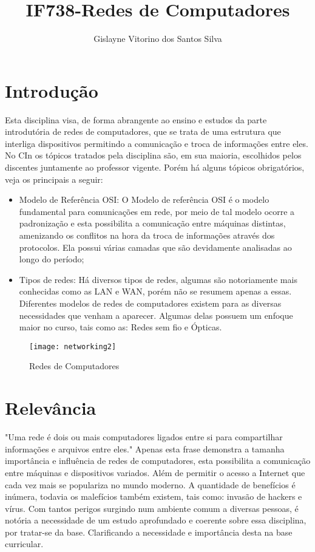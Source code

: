 \documentclass{article}
\title{IF738-Redes de Computadores}
\author{Gislayne Vitorino dos Santos Silva }
\date{\vspace{-5ex}}
\begin{document}
\maketitle

\section{Introdução}
Esta disciplina visa, de forma abrangente ao ensino e estudos da parte introdutória de redes de computadores, que se trata de uma estrutura que interliga dispositivos permitindo a comunicação e troca de informações entre eles. No CIn os tópicos tratados pela disciplina são, em sua maioria, escolhidos pelos discentes juntamente ao professor vigente.
\cite{primeira, segunda}
Porém há alguns tópicos obrigatórios, veja os principais a seguir:
\begin{itemize}
   \item Modelo de Referência OSI: O Modelo de referência OSI é o modelo fundamental para comunicações em rede, por meio de tal modelo ocorre a padronização e esta possibilita a comunicação entre máquinas distintas, amenizando os conflitos na hora da troca de informações através dos protocolos. Ela possui várias camadas que são devidamente analisadas ao longo do período;
   \cite{terceira, sexta}
   \item Tipos de redes: Há diversos tipos de redes, algumas são notoriamente mais conhecidas como as LAN e WAN, porém não se resumem apenas a essas. Diferentes modelos de redes de computadores existem para as diversas necessidades que venham a aparecer. Algumas delas possuem um enfoque maior no curso, tais como as: Redes sem fio e Ópticas.
   \cite{setima}
 \end{itemize}


\begin{figure}[h!]
\centering
\texttt{[image: networking2]}
\caption{Redes de Computadores}
\cite{nona}
\label{fig: networking2}
\end{figure}

\section{Relevância}
"Uma rede é dois ou mais computadores ligados entre si para compartilhar informações e arquivos entre eles."
\cite{quarta}
Apenas esta frase demonstra a tamanha importância e influência de redes de computadores, esta possibilita a comunicação entre máquinas e dispositivos variados. Além de permitir o acesso a Internet que cada vez mais se populariza no mundo moderno. A quantidade de benefícios é inúmera, todavia os malefícios também existem, tais como: invasão de hackers e vírus. Com tantos perigos surgindo num ambiente comum a diversas pessoas, é notória a necessidade de um estudo aprofundado e coerente sobre essa disciplina, por tratar-se da base. Clarificando a necessidade e importância desta na base curricular.
\end{document}
